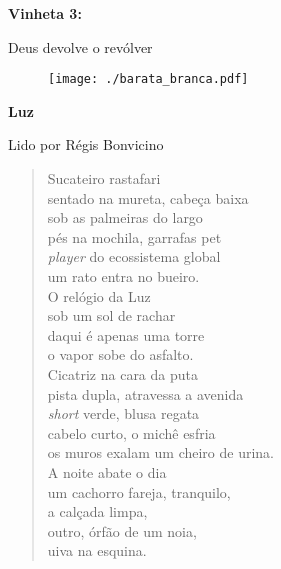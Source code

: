\pagebreak

\begin{absolutelynopagebreak}
\textbf{Vinheta 3:}

Deus devolve o revólver

\thispagestyle{empty}

\begin{vplace}
\begin{figure}[H]
\begin{adjustwidth}{-1.7cm}{}
  \vspace*{13.4cm}
  \texttt{[image: ./barata\_branca.pdf]}  
\end{adjustwidth}

\end{figure}
\end{vplace}

\end{absolutelynopagebreak}

\pagebreak

\textbf{Luz}

Lido por Régis Bonvicino

\begin{verse}
Sucateiro rastafari\\
sentado na mureta, cabeça baixa\\
sob as palmeiras do largo\\
pés na mochila, garrafas pet\\[5pt]
\emph{player} do ecossistema global\\
um rato entra no bueiro.\\
O relógio da Luz\\
sob um sol de rachar\\[5pt]
daqui é apenas uma torre\\
o vapor sobe do asfalto.\\
Cicatriz na cara da puta\\
pista dupla, atravessa a avenida\\[5pt]
\emph{short} verde, blusa regata\\
cabelo curto, o michê esfria\\
os muros exalam um cheiro de urina.\\
A noite abate o dia\\[5pt]
um cachorro fareja, tranquilo,\\
a calçada limpa,\\
outro, órfão de um noia,\\
uiva na esquina.
\end{verse}


